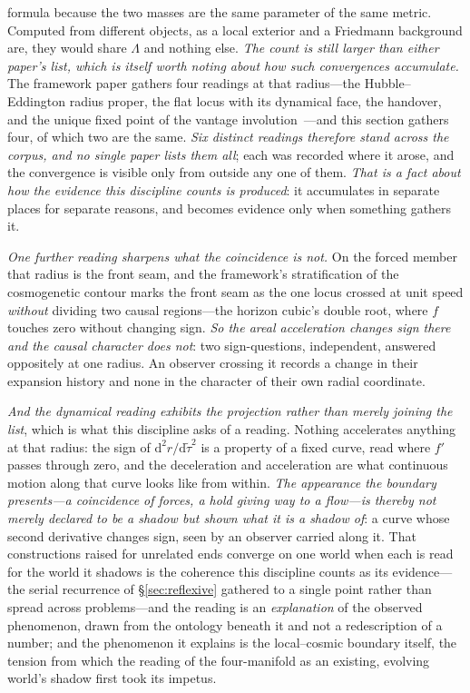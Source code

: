 \documentclass[11pt,a4paper]{article}
\newcommand{\dd}{\mathrm{d}}
\begin{document}
formula because the two masses are the same parameter of the same metric. Computed from different objects, as a
local exterior and a Friedmann background are, they would share $\Lambda$ and nothing else. \emph{The count is
still larger than either paper's list, which is itself worth noting about how such convergences accumulate.} The
framework paper gathers four readings at that radius---the Hubble--Eddington radius proper, the flat locus with
its dynamical face, the handover, and the unique fixed point of the vantage
involution~\cite{JanzenCRframework}---and this section gathers four, of which two are the same. \emph{Six
distinct readings therefore stand across the corpus, and no single paper lists them all}; each was recorded
where it arose, and the convergence is visible only from outside any one of them. \emph{That is a fact about
how the evidence this discipline counts is produced}: it accumulates in separate places for separate reasons,
and becomes evidence only when something gathers it.

\emph{One further reading sharpens what the coincidence is not.} On the forced member that radius is the front
seam, and the framework's stratification of the cosmogenetic contour marks the front seam as the one locus
crossed at unit speed \emph{without} dividing two causal regions---the horizon cubic's double root, where $f$
touches zero without changing sign. \emph{So the areal acceleration changes sign there and the causal character
does not}: two sign-questions, independent, answered oppositely at one radius. An observer crossing it records
a change in their expansion history and none in the character of their own radial coordinate.

\emph{And the dynamical reading exhibits the projection rather than merely joining the list}, which is what this
discipline asks of a reading. Nothing accelerates anything at that radius: the sign of
$\dd^{2}r/\dd\tilde\tau^{2}$ is a property of a fixed curve, read where $f'$ passes through zero, and the
deceleration and acceleration are what continuous motion along that curve looks like from within. \emph{The
appearance the boundary presents---a coincidence of forces, a hold giving way to a flow---is thereby not merely
declared to be a shadow but shown what it is a shadow of}: a curve whose second derivative changes sign, seen
by an observer carried along it. That constructions raised for unrelated ends converge on one world when each is read for the world it shadows is the coherence this discipline counts as its evidence---the serial recurrence of \S\ref{sec:reflexive} gathered to a single point rather than spread across problems---and the reading is an \emph{explanation} of the observed phenomenon, drawn from the ontology beneath it and not a redescription of a number; and the phenomenon it explains is the local--cosmic boundary itself, the tension from which the reading of the four-manifold as an existing, evolving world's shadow first took its impetus.
\end{document}
